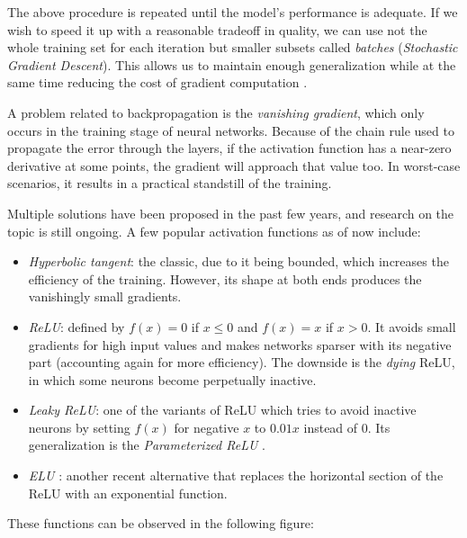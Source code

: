    The above procedure is repeated until the model's performance is adequate. If we wish to speed it up with a reasonable tradeoff in quality, we can use not the whole training set for each iteration but smaller subsets called \textit{batches} (\textit{Stochastic Gradient Descent}). This allows us to maintain enough generalization while at the same time reducing the cost of gradient computation \cite{lecun-dl}.

    A problem related to backpropagation is the \textit{vanishing gradient}, which only occurs in the training stage of neural networks. Because of the chain rule used to propagate the error through the layers, if the activation function has a near-zero derivative at some points, the gradient will approach that value too. In worst-case scenarios, it results in a practical standstill of the training.

    Multiple solutions have been proposed in the past few years, and research on the topic is still ongoing. A few popular activation functions as of now include:

    \begin{itemize}

    	\item
    	\textit{Hyperbolic tangent}: the classic, due to it being bounded, which increases the efficiency of the training. However, its shape at both ends produces the vanishingly small gradients.

    	\item
    	\textit{\ac{ReLU}}: defined by $f(x) = 0$ if $x \leq 0$ and $f(x) = x$ if $x > 0$. It avoids small gradients for high input values and makes networks sparser with its negative part (accounting again for more efficiency). The downside is the \textit{dying} \acs{ReLU}, in which some neurons become perpetually inactive.

    	\item
    	\textit{Leaky \acs{ReLU}}: one of the variants of \acs{ReLU} which tries to avoid inactive neurons by setting $f(x)$ for negative $x$ to $0.01x$ instead of $0$. Its generalization is the \textit{Parameterized ReLU} \cite{delv-deep-relu,deep-res-relu}.

    	\item
    	\textit{\ac{ELU}} \cite{elu}: another recent alternative that replaces the horizontal section of the \acs{ReLU} with an exponential function.

    \end{itemize}

    These functions can be observed in the following figure:

